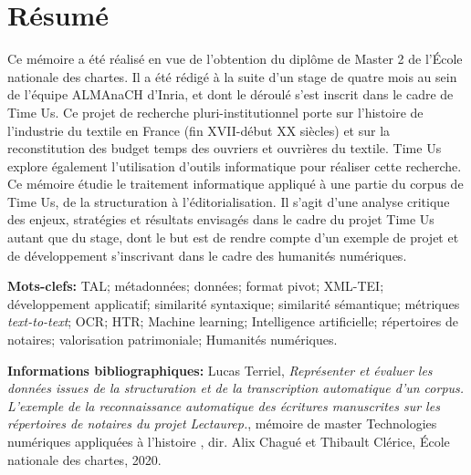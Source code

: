 \chapter*{Résumé}
Ce mémoire a été réalisé en vue de l'obtention du diplôme de Master 2  de l'École nationale des chartes. Il a été rédigé à la suite d'un stage de quatre mois au sein de l'équipe ALMAnaCH d'Inria, et dont le déroulé s'est inscrit dans le cadre de Time Us. Ce projet de recherche pluri-institutionnel porte sur l'histoire de l'industrie du textile en France (fin XVII-début XX siècles) et sur la reconstitution des budget temps des ouvriers et ouvrières du textile. Time Us explore également l'utilisation d'outils informatique pour réaliser cette recherche. 
Ce mémoire étudie le traitement informatique appliqué à une partie du corpus de Time Us, de la structuration à l'éditorialisation. 
Il s'agit d'une analyse critique des enjeux, stratégies et résultats envisagés dans le cadre du projet Time Us autant que du stage, dont le but est de rendre compte d'un exemple de projet et de développement s'inscrivant dans le cadre des humanités numériques.


\bigskip

\textbf{Mots-clefs:} TAL; métadonnées; données; format pivot; XML-TEI; développement applicatif; similarité syntaxique; similarité sémantique; métriques \textit{text-to-text}; OCR; HTR; Machine learning; Intelligence artificielle; répertoires de notaires; valorisation patrimoniale; Humanités numériques.

\bigskip
\bigskip
\bigskip

\textbf{Informations bibliographiques:} Lucas Terriel, \textit{Représenter et évaluer les données issues de la structuration et de la transcription automatique d'un corpus. L'exemple de la reconnaissance automatique des écritures manuscrites sur les répertoires de notaires du projet Lectaurep.}, mémoire de master \og Technologies numériques appliquées à l'histoire \fg{}, dir. Alix Chagué et Thibault Clérice, École nationale des chartes, 2020.

\clearpage
\thispagestyle{empty}
\cleardoublepage